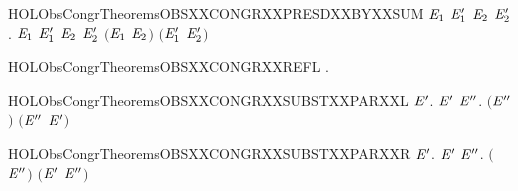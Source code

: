 \newcommand{\HOLObsCongrTheoremsOBSXXCONGRXXPRESDXXBYXXPAR}{\UseVerbatim{HOLObsCongrTheoremsOBSXXCONGRXXPRESDXXBYXXPAR}}
\begin{SaveVerbatim}{HOLObsCongrTheoremsOBSXXCONGRXXPRESDXXBYXXSUM}
\HOLTokenTurnstile{} \HOLSymConst{\HOLTokenForall{}}\ensuremath{\HOLBoundVar{E}\sb{\mathrm{1}}} \ensuremath{\HOLBoundVar{E}\sb{\mathrm{1}}\sp{\prime}} \ensuremath{\HOLBoundVar{E}\sb{\mathrm{2}}} \ensuremath{\HOLBoundVar{E}\sb{\mathrm{2}}\sp{\prime}}.
        \ensuremath{\HOLBoundVar{E}\sb{\mathrm{1}}} \ensuremath{\HOLBoundVar{E}\sb{\mathrm{1}}\sp{\prime}} \HOLSymConst{\HOLTokenConj{}}  \ensuremath{\HOLBoundVar{E}\sb{\mathrm{2}}} \ensuremath{\HOLBoundVar{E}\sb{\mathrm{2}}\sp{\prime}} \HOLSymConst{\HOLTokenImp{}}
        \ensuremath{(}\ensuremath{\HOLBoundVar{E}\sb{\mathrm{1}}} \HOLSymConst{\ensuremath{+}} \ensuremath{\HOLBoundVar{E}\sb{\mathrm{2}}}\ensuremath{)} \ensuremath{(}\ensuremath{\HOLBoundVar{E}\sb{\mathrm{1}}\sp{\prime}} \HOLSymConst{\ensuremath{+}} \ensuremath{\HOLBoundVar{E}\sb{\mathrm{2}}\sp{\prime}}\ensuremath{)}
\end{SaveVerbatim}
\newcommand{\HOLObsCongrTheoremsOBSXXCONGRXXPRESDXXBYXXSUM}{\UseVerbatim{HOLObsCongrTheoremsOBSXXCONGRXXPRESDXXBYXXSUM}}
\begin{SaveVerbatim}{HOLObsCongrTheoremsOBSXXCONGRXXREFL}
\HOLTokenTurnstile{} \HOLSymConst{\HOLTokenForall{}}.   
\end{SaveVerbatim}
\newcommand{\HOLObsCongrTheoremsOBSXXCONGRXXREFL}{\UseVerbatim{HOLObsCongrTheoremsOBSXXCONGRXXREFL}}
\begin{SaveVerbatim}{HOLObsCongrTheoremsOBSXXCONGRXXSUBSTXXPARXXL}
\HOLTokenTurnstile{} \HOLSymConst{\HOLTokenForall{}} \ensuremath{\HOLBoundVar{E}\sp{\prime}}.   \ensuremath{\HOLBoundVar{E}\sp{\prime}} \HOLSymConst{\HOLTokenImp{}} \HOLSymConst{\HOLTokenForall{}}\ensuremath{\HOLBoundVar{E}\sp{\prime\prime}}.  \ensuremath{(}\ensuremath{\HOLBoundVar{E}\sp{\prime\prime}} \HOLSymConst{\ensuremath{\mid}} \ensuremath{)} \ensuremath{(}\ensuremath{\HOLBoundVar{E}\sp{\prime\prime}} \HOLSymConst{\ensuremath{\mid}} \ensuremath{\HOLBoundVar{E}\sp{\prime}}\ensuremath{)}
\end{SaveVerbatim}
\newcommand{\HOLObsCongrTheoremsOBSXXCONGRXXSUBSTXXPARXXL}{\UseVerbatim{HOLObsCongrTheoremsOBSXXCONGRXXSUBSTXXPARXXL}}
\begin{SaveVerbatim}{HOLObsCongrTheoremsOBSXXCONGRXXSUBSTXXPARXXR}
\HOLTokenTurnstile{} \HOLSymConst{\HOLTokenForall{}} \ensuremath{\HOLBoundVar{E}\sp{\prime}}.   \ensuremath{\HOLBoundVar{E}\sp{\prime}} \HOLSymConst{\HOLTokenImp{}} \HOLSymConst{\HOLTokenForall{}}\ensuremath{\HOLBoundVar{E}\sp{\prime\prime}}.  \ensuremath{(} \HOLSymConst{\ensuremath{\mid}} \ensuremath{\HOLBoundVar{E}\sp{\prime\prime}}\ensuremath{)} \ensuremath{(}\ensuremath{\HOLBoundVar{E}\sp{\prime}} \HOLSymConst{\ensuremath{\mid}} \ensuremath{\HOLBoundVar{E}\sp{\prime\prime}}\ensuremath{)}
\end{SaveVerbatim}
